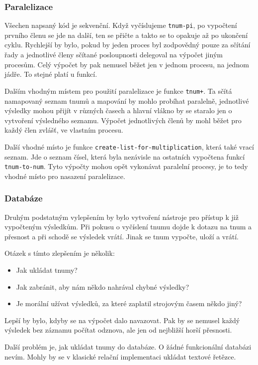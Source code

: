 \subsubsection{Paralelizace}
Všechen napsaný kód je sekvenční. Když vyčíslujeme \texttt{tnum-pi}, po vypočtení prvního členu se jde na další, ten se přičte a takto se to opakuje až po ukončení cyklu. Rychlejší by bylo, pokud by jeden proces byl zodpovědný pouze za sčítání řady a jednotlivé členy sčítané posloupnosti delegoval na výpočet jiným procesům. Celý výpočet by pak nemusel běžet jen v jednom procesu, na jednom jádře. To stejné platí u funkcí.

Dalším vhodným místem pro použití paralelizace je funkce \texttt{tnum+}. Ta sčítá namapovaný seznam tnumů a mapování by mohlo probíhat paralelně, jednotlivé výsledky mohou přijít v různých časech a hlavní vlákno by se staralo jen o vytvoření výsledného seznamu. Výpočet jednotlivých členů by mohl běžet pro každý člen zvlášť, ve vlastním procesu.

Další vhodné místo je funkce \texttt{create-list-for-multiplication}, která také vrací seznam. Jde o seznam čísel, která byla nezávisle na ostatních vypočtena funkcí \texttt{tnum-to-num}. Tyto výpočty mohou opět vykonávat paralelní procesy, je to tedy vhodné místo pro nasazení paralelizace.

\subsubsection{Databáze}
Druhým podstatným vylepšením by bylo vytvoření nástroje pro přístup k již vypočteným výsledkům. Při pokusu o vyčíslení tnumu dojde k dotazu na tnum a přesnost a při schodě se výsledek vrátí. Jinak se tnum vypočte, uloží a vrátí.

Otázek s tímto zlepšením je několik:
\begin{itemize}
\item{Jak ukládat tnumy?}
\item{Jak zabránit, aby nám někdo nahrával chybné výsledky?}
\item{Je morální užívat výsledků, za které zaplatil strojovým časem někdo jiný?}
\end{itemize}

Lepší by bylo, kdyby se na výpočet dalo navazovat. Pak by se nemusel každý výsledek bez záznamu počítat odznova, ale jen od nejbližší horší přesnosti.

Další problém je, jak ukládat tnumy do databáze. O žádné funkcionální databázi nevím. Mohly by se v klasické relační implementaci ukládat textové řetězce.

